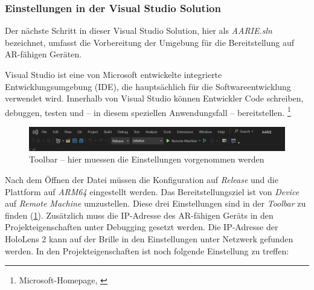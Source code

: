 \subsubsection*{Einstellungen in der Visual Studio Solution}

Der nächste Schritt in dieser Visual Studio Solution, hier als \textit{AARIE.sln} bezeichnet, umfasst die Vorbereitung der Umgebung für die Bereitstellung auf AR-fähigen Geräten.

Visual Studio ist eine von Microsoft entwickelte integrierte Entwicklungsumgebung (IDE), die hauptsächlich für die
Softwareentwicklung verwendet wird. Innerhalb von Visual Studio können Entwickler Code schreiben, debuggen, testen
und – in diesem speziellen Anwendungsfall – bereitstellen. \footnote{Microsoft-Homepage, \cite{Visual-Studio}}


\begin{figure}[H]
    \centering
    \includegraphics[scale=0.6]{images/toolbar}
    \caption{Toolbar – hier muessen die Einstellungen vorgenommen werden}
    \label{fig:vstoolbar}
\end{figure}

Nach dem Öffnen der Datei müssen die Konfiguration auf \textit{Release} und die Plattform auf \textit{ARM64} eingestellt werden. Das Bereitstellungsziel ist von \textit{Device} auf \textit{Remote Machine} umzustellen. Diese drei Einstellungen sind in der \textit{Toolbar} zu finden (\ref{fig:vstoolbar}). Zusätzlich muss die IP-Adresse des AR-fähigen Geräts in den Projekteigenschaften unter Debugging gesetzt werden. Die IP-Adresse der HoloLens 2 kann auf der Brille in den Einstellungen unter Netzwerk gefunden werden. In den Projekteigenschaften ist noch folgende Einstellung zu treffen:

